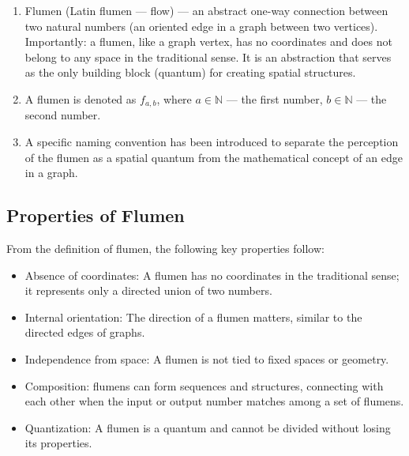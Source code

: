 \documentclass[final]{article}
\begin{document}
        \begin{enumerate}

            \item Flumen (Latin flumen — flow) — an abstract one-way connection 
            between two natural numbers (an oriented edge in a graph between two 
            vertices). Importantly: a flumen, like a graph vertex, has no 
            coordinates and does not belong to any space in the traditional 
            sense. It is an abstraction that serves as the only building block 
            (quantum) for creating spatial structures.

            \item A flumen is denoted as \( f_{a,b} \), where \( a \in 
            \mathbb{N} \) — the first number, \( b \in \mathbb{N} \) — the 
            second number.

            \item A specific naming convention has been introduced to separate 
            the perception of the flumen as a spatial quantum from the 
            mathematical concept of an edge in a graph.

        \end{enumerate}


    \subsection{Properties of Flumen}

        From the definition of flumen, the following key properties follow:
        \begin{itemize}
            \item Absence of coordinates: A flumen has no coordinates in the traditional
            sense; it represents only a directed union of two
            numbers.
            \item Internal orientation: The direction of a flumen matters, similar to the directed edges of graphs.
            \item Independence from space: A flumen is not tied to fixed
            spaces or geometry.
            \item Composition: flumens can form sequences and
            structures, connecting with each other when the input
            or output number matches among a set of flumens.
            \item Quantization: A flumen is a quantum and cannot be divided
            without losing its properties.
        \end{itemize}
\end{document}
